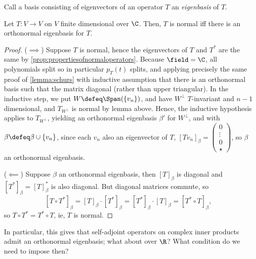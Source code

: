 \begin{definition}[Eigenbasis]
    Call a basis consisting of eigenvectors of an operator $T$ an \emph{eigenbasis} of $T$.
\end{definition}

\begin{theorem}
    Let $T : V\to V$ on $V$ finite dimensional over $\C$. Then, $T$ is normal iff there is an orthonormal eigenbasis for $T$.
\end{theorem}

\begin{lemma}
\end{lemma}

\begin{proof}
    ($\implies$) Suppose $T$ is normal, hence the eigenvectors of $T$ and $T^\ast$ are the same by \cref{prop:propertiesofnormaloperators}. Because $\field  = \C$, all polynomials split so in particular $p_T(t)$ splits, and applying precisely the same proof of \cref{lemma:schurs} with inductive assumption that there is an orthonormal basis such that the matrix diagonal (rather than upper triangular). In the inductive step, we put $W \defeq \Span (\{v_n\})$, and have $W^\perp$ $T$-invariant and $n - 1$ dimensional, and $T_{W^\perp}$ is normal by lemma above. Hence, the inductive hypothesis applies to $T_{W^\perp}$, yielding an orthonormal eigenbasis $\beta'$ for $W^\perp$, and  with $\beta \defeq \beta \cup \{v_n\}$, since each $v_n$ also an eigenvector of $T$, $[Tv_n]_\beta = \begin{pmatrix}
        0 \\
        \vdots\\
        0\\
        \star
    \end{pmatrix}$, so $\beta$ an orthonormal eigenbasis.

    ($\impliedby$) Suppose $\beta$ an orthonormal eigenbasis, then $[T]_\beta$ is diagonal and $[T^\ast]_\beta = [T]_\beta^\ast$ is also diagonal. But diagonal matrices commute, so \[
    [T \circ T^\ast]_\beta = [T]_\beta \cdot [T^\ast]_\beta = [T^\ast]_\beta \cdot [T]_\beta = [T^\ast \circ T]_\beta,    
    \]
    so $T\circ T^\ast = T^\ast \circ T$, ie, $T$ is normal.
\end{proof}

In particular, this gives that self-adjoint operators on complex inner products admit an orthonormal eigenbasis; what about over $\R$? What condition do we need to impose then?

